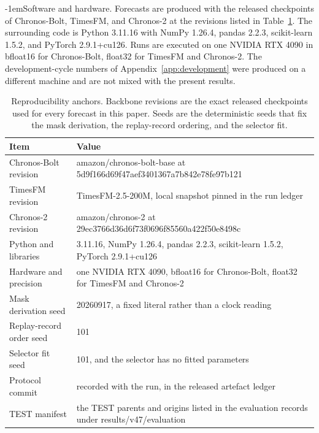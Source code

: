 \documentclass{article}
\makeatletter
\def\paragraph{\@startsection{paragraph}{4}{\z@}{1.1ex plus 0.3ex minus .2ex}%
  {-1em}{\normalsize\bf}}
\makeatother
\begin{document}
\paragraph{Software and hardware.} Forecasts are produced with the released checkpoints of
Chronos-Bolt, TimesFM, and Chronos-2 at the revisions listed in Table~\ref{tab:app-repro}.
The surrounding code is Python 3.11.16 with NumPy 1.26.4, pandas
2.2.3, scikit-learn 1.5.2, and PyTorch 2.9.1+cu126. Runs are
executed on one NVIDIA RTX 4090 in bfloat16 for Chronos-Bolt, float32 for TimesFM and Chronos-2. The development-cycle numbers of
Appendix~\ref{app:development} were produced on a different machine and are not mixed with the
present results.

\begin{table}[h]
  \caption{Reproducibility anchors. Backbone revisions are the exact released checkpoints used
  for every forecast in this paper. Seeds are the deterministic seeds that fix the mask
  derivation, the replay-record ordering, and the selector fit.}
  \label{tab:app-repro}
  \centering
  \small
  \setlength{\tabcolsep}{4pt}
  \begin{tabular}{@{}l p{}@{}}
    \toprule
    Item & Value \\
    \midrule
    Chronos-Bolt revision   & amazon/chronos-bolt-base at 5d9f166d69f47aef3401367a7b842e78fe97b121 \\
    TimesFM revision        & TimesFM-2.5-200M, local snapshot pinned in the run ledger \\
    Chronos-2 revision      & amazon/chronos-2 at 29ec3766d36d6f73f0696f85560a422f50e8498c \\
    Python and libraries    & 3.11.16, NumPy 1.26.4, pandas 2.2.3, scikit-learn 1.5.2, PyTorch 2.9.1+cu126 \\
    Hardware and precision  & one NVIDIA RTX 4090, bfloat16 for Chronos-Bolt, float32 for TimesFM and Chronos-2 \\
    Mask derivation seed    & 20260917, a fixed literal rather than a clock reading \\
    Replay-record order seed & 101 \\
    Selector fit seed       & 101, and the selector has no fitted parameters \\
    Protocol commit         & recorded with the run, in the released artefact ledger \\
    TEST manifest           & the TEST parents and origins listed in the evaluation records under results/v47/evaluation \\
    \bottomrule
  \end{tabular}
\end{table}
\end{document}
